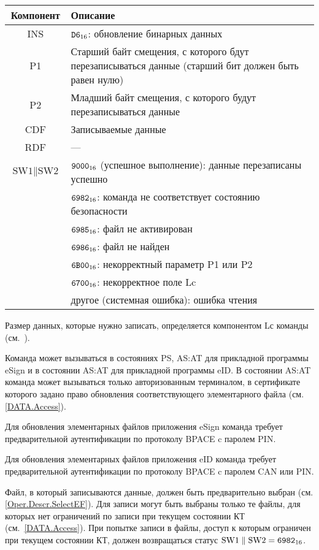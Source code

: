 \noindent
\begin{tabular}{|c|p{14cm}|}
\hline
Компонент & Описание\\
\hline
\hline
INS & $\texttt{D6}_{16}$: обновление бинарных данных\\
\hline
P1 & Старший байт смещения, с которого бдут перезаписываться данные 
(старший бит должен быть равен нулю) \\
\hline
P2 & Младший байт смещения, с которого будут перезаписываться данные \\
\hline
CDF & Записываемые данные \\
\hline \hline
RDF &  --- \\
\hline
$\text{SW1} \parallel \text{SW2}$ & 
$\texttt{9000}_{16}$ (успешное выполнение): данные перезаписаны успешно \\
 & $\texttt{6982}_{16}$: команда не соответствует состоянию безопасности \\
 & $\texttt{6985}_{16}$: файл не активирован \\
 & $\texttt{6986}_{16}$: файл не найден \\
 & $\texttt{6B00}_{16}$: некорректный параметр P1 или P2 \\
 & $\texttt{6700}_{16}$: некорректное поле Lc\\
 & другое (системная ошибка): ошибка чтения \\
\hline
\end{tabular}

Размер данных, которые нужно записать, определяется компонентом Lс команды 
(см.~\cite{APDU}).

Команда может вызываться в состояниях PS, AS:AT 
для прикладной программы eSign и в состоянии 
AS:AT для прикладной программы eID.
В состоянии AS:AT команда может вызываться только 
авторизованным терминалом, в сертификате которого
задано право обновления соответствующего 
элементарного файла (см. \ref{DATA.Access}).

Для обновления элементарных файлов приложения eSign команда требует 
предварительной аутентификации по протоколу BPACE c 
паролем PIN.

Для обновления элементарных файлов приложения eID команда требует 
предварительной аутентификации по протоколу BPACE c 
паролем CAN или PIN.

Файл, в который записываются данные, должен быть предварительно
выбран (см. \ref{Oper.Descr.SelectEF}).
Для записи могут быть выбраны только те файлы, для которых 
нет ограничений по записи при текущем состоянии КТ (см.~\ref{DATA.Access}). 
При попытке записи в файлы, доступ к которым ограничен при текущем состоянии КТ, 
должен возвращаться статус $\text{SW1} \parallel\text{SW2} = \texttt{6982}_{16}$. 


